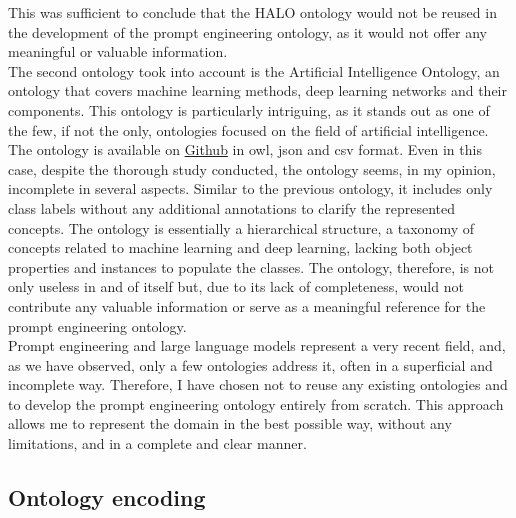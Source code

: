 This was sufficient to conclude that the HALO ontology would not be reused in the development of the prompt engineering ontology, as it would not offer any meaningful or valuable information.\\
The second ontology took into account is the Artificial Intelligence Ontology\cite{aio}, an ontology that covers machine learning methods, deep learning networks and their components. This ontology is particularly intriguing, as it stands out as one of the few, if not the only, ontologies focused on the field of artificial intelligence. The ontology is available on \href{https://github.com/berkeleybop/artificial-intelligence-ontology}{Github} in owl, json and csv format. Even in this case, despite the thorough study conducted, the ontology seems, in my opinion, incomplete in several aspects. Similar to the previous ontology, it includes only class labels without any additional annotations to clarify the represented concepts. The ontology is essentially a hierarchical structure, a taxonomy of concepts related to machine learning and deep learning, lacking both object properties and instances to populate the classes. The ontology, therefore, is not only useless in and of itself but, due to its lack of completeness, would not contribute any valuable information or serve as a meaningful reference for the prompt engineering ontology.\\ Prompt engineering and large language models represent a very recent field, and, as we have observed, only a few ontologies address it, often in a superficial and incomplete way. Therefore, I have chosen not to reuse any existing ontologies and to develop the prompt engineering ontology entirely from scratch. This approach allows me to represent the domain in the best possible way, without any limitations, and in a complete and clear manner.

\newpage
\subsection{Ontology encoding}
